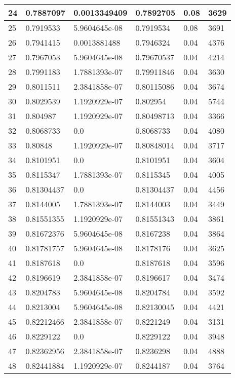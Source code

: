 \begin{longtable}{|l|l|l|l|l|l|}
24 & 0.7887097 & 0.0013349409 & 0.7892705 & 0.08 & 3629 \\ \hline 
25 & 0.7919533 & 5.9604645e-08 & 0.7919534 & 0.08 & 3691 \\ \hline 
26 & 0.7941415 & 0.0013881488 & 0.7946324 & 0.04 & 4376 \\ \hline 
27 & 0.7967053 & 5.9604645e-08 & 0.79670537 & 0.04 & 4214 \\ \hline 
28 & 0.7991183 & 1.7881393e-07 & 0.79911846 & 0.04 & 3630 \\ \hline 
29 & 0.8011511 & 2.3841858e-07 & 0.80115086 & 0.04 & 3674 \\ \hline 
30 & 0.8029539 & 1.1920929e-07 & 0.802954 & 0.04 & 5744 \\ \hline 
31 & 0.804987 & 1.1920929e-07 & 0.80498713 & 0.04 & 3366 \\ \hline 
32 & 0.8068733 & 0.0 & 0.8068733 & 0.04 & 4080 \\ \hline 
33 & 0.80848 & 1.1920929e-07 & 0.80848014 & 0.04 & 3717 \\ \hline 
34 & 0.8101951 & 0.0 & 0.8101951 & 0.04 & 3604 \\ \hline 
35 & 0.8115347 & 1.7881393e-07 & 0.8115345 & 0.04 & 4005 \\ \hline 
36 & 0.81304437 & 0.0 & 0.81304437 & 0.04 & 4456 \\ \hline 
37 & 0.8144005 & 1.7881393e-07 & 0.8144003 & 0.04 & 3449 \\ \hline 
38 & 0.81551355 & 1.1920929e-07 & 0.81551343 & 0.04 & 3861 \\ \hline 
39 & 0.81672376 & 5.9604645e-08 & 0.8167238 & 0.04 & 3864 \\ \hline 
40 & 0.81781757 & 5.9604645e-08 & 0.8178176 & 0.04 & 3625 \\ \hline 
41 & 0.8187618 & 0.0 & 0.8187618 & 0.04 & 3596 \\ \hline 
42 & 0.8196619 & 2.3841858e-07 & 0.8196617 & 0.04 & 3474 \\ \hline 
43 & 0.8204783 & 5.9604645e-08 & 0.8204784 & 0.04 & 3592 \\ \hline 
44 & 0.8213004 & 5.9604645e-08 & 0.82130045 & 0.04 & 4421 \\ \hline 
45 & 0.82212466 & 2.3841858e-07 & 0.8221249 & 0.04 & 3131 \\ \hline 
46 & 0.8229122 & 0.0 & 0.8229122 & 0.04 & 3948 \\ \hline 
47 & 0.82362956 & 2.3841858e-07 & 0.8236298 & 0.04 & 4888 \\ \hline 
48 & 0.82441884 & 1.1920929e-07 & 0.8244187 & 0.04 & 3764 \\ \hline 

\end{longtable}
